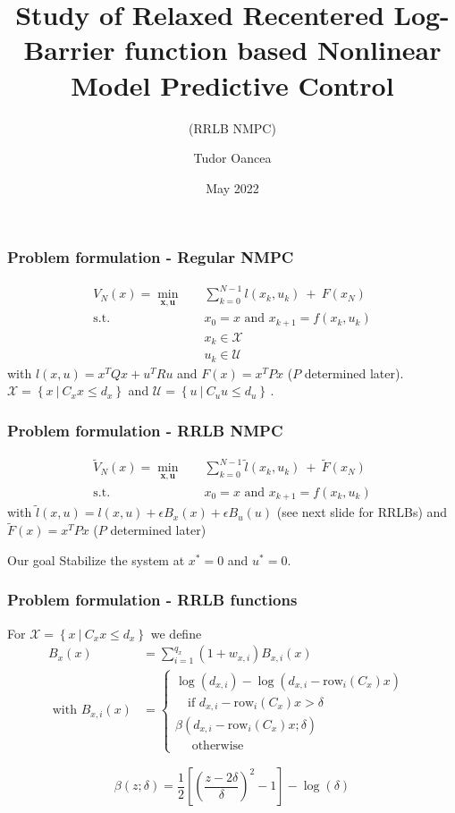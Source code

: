 \documentclass[10pt]{beamer}
\title[RRLB NMPC]{Study of Relaxed Recentered Log-Barrier function based Nonlinear Model Predictive Control}
\subtitle{(RRLB NMPC)}
\author{Tudor Oancea}
\date{May 2022}
\def\cal#1{\mathcal{#1}}
\begin{document}
\frame{\titlepage}

\begin{frame}
    \frametitle{Problem formulation - Regular NMPC}
    \begin{align*}
        V_N(x)=\underset{\mathbf{x},\mathbf{u}}{\min} &\quad \sum_{k=0}^{N-1}l(x_k,u_k)~+~F(x_N)\\
        \text{s.t.} &\quad x_0=x\text{ and }x_{k+1}=f(x_k,u_k)\\
        &\quad x_k\in\cal{X}\\
        &\quad u_k\in\cal{U}
    \end{align*}
    with $l(x,u)=x^TQx+u^TRu$ and $F(x)=x^TPx$ ($P$ determined later).
     $\mathcal{X}=\left\{x~|~C_xx\leq d_x \right\}$ and $\mathcal{U}=\left\{u~|~C_uu\leq d_u \right\}$\,.
\end{frame}

\begin{frame}
    \frametitle{Problem formulation - RRLB NMPC}
    \begin{align*}
        \tilde{V}_N(x)=\underset{\mathbf{x},\mathbf{u}}{\min} &\quad \sum_{k=0}^{N-1}\tilde{l}(x_k,u_k)~+~\tilde{F}(x_N)\\
        \text{s.t.} &\quad x_0=x\text{ and }x_{k+1}=f(x_k,u_k)
    \end{align*}
    with $\tilde{l}(x,u)=l(x,u) + \epsilon B_x(x)+\epsilon B_u(u)$ (see next slide for RRLBs) and $\tilde{F}(x)=x^TPx$ ($P$ determined later)
    \begin{alertblock}{Our goal}
        Stabilize the system at $x^*=0$ and $u^*=0$.
    \end{alertblock}
\end{frame}

\begin{frame}
    \frametitle{Problem formulation - RRLB functions}

    For $\cal{X}=\left\{ x~|~C_xx\leq d_x \right\}$ we define 
    \begin{align*}
        B_x(x)&=\sum_{i=1}^{q_x}(1+w_{x,i})B_{x,i}(x)\\
        \text{ with }B_{x,i}(x)&=\begin{cases}
            \log(d_{x,i})-\log(d_{x,i}-\mathrm{row}_i(C_x)x)&\\
            \quad\text{if }d_{x,i}-\mathrm{row}_i(C_x)x>\delta\\
            \beta(d_{x,i}-\mathrm{row}_i(C_x)x;\delta)&\\
            \quad\text{ otherwise}
        \end{cases}
    \end{align*}

    $$\beta(z;\delta)=\frac{1}{2}\left[ \left( \frac{z-2\delta}{\delta} \right)^2-1 \right]-\log(\delta)$$
\end{frame}
\end{document}
